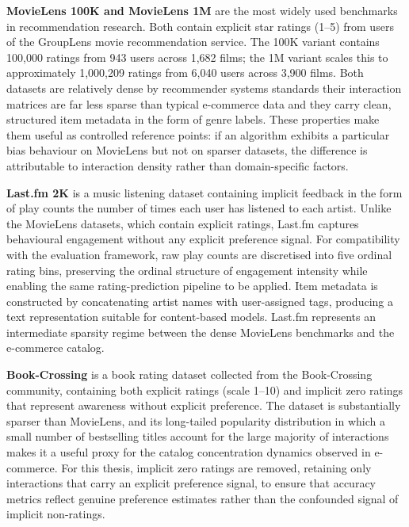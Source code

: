 \documentclass[11pt,a4paper]{report}
\begin{document}
\textbf{MovieLens 100K and MovieLens 1M} \citep{harper2015movielens} are the most widely used benchmarks in recommendation research. Both contain explicit star ratings (1--5) from users of the GroupLens movie recommendation service. The 100K variant contains 100,000 ratings from 943 users across 1,682 films; the 1M variant scales this to approximately 1,000,209 ratings from 6,040 users across 3,900 films. Both datasets are relatively dense by recommender systems standards their interaction matrices are far less sparse than typical e-commerce data and they carry clean, structured item metadata in the form of genre labels. These properties make them useful as controlled reference points: if an algorithm exhibits a particular bias behaviour on MovieLens but not on sparser datasets, the difference is attributable to interaction density rather than domain-specific factors.

\textbf{Last.fm 2K} \citep{cantador2011second} is a music listening dataset containing implicit feedback in the form of play counts the number of times each user has listened to each artist. Unlike the MovieLens datasets, which contain explicit ratings, Last.fm captures behavioural engagement without any explicit preference signal. For compatibility with the evaluation framework, raw play counts are discretised into five ordinal rating bins, preserving the ordinal structure of engagement intensity while enabling the same rating-prediction pipeline to be applied. Item metadata is constructed by concatenating artist names with user-assigned tags, producing a text representation suitable for content-based models. Last.fm represents an intermediate sparsity regime between the dense MovieLens benchmarks and the e-commerce catalog.

\textbf{Book-Crossing} \citep{ziegler2005improving} is a book rating dataset collected from the Book-Crossing community, containing both explicit ratings (scale 1--10) and implicit zero ratings that represent awareness without explicit preference. The dataset is substantially sparser than MovieLens, and its long-tailed popularity distribution in which a small number of bestselling titles account for the large majority of interactions makes it a useful proxy for the catalog concentration dynamics observed in e-commerce. For this thesis, implicit zero ratings are removed, retaining only interactions that carry an explicit preference signal, to ensure that accuracy metrics reflect genuine preference estimates rather than the confounded signal of implicit non-ratings.
\end{document}
